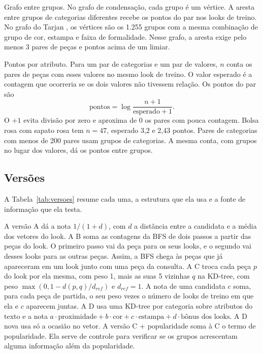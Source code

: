 \documentclass[conference]{IEEEtran}
\begin{document}
Grafo entre grupos. No grafo de condensação, cada grupo é um vértice. A aresta entre grupos de categorias diferentes recebe os pontos do par nos looks de treino. No grafo do Tarjan \cite{tarjan1972}, os vértices são os 1.255 grupos com a mesma combinação de grupo de cor, estampa e faixa de formalidade. Nesse grafo, a aresta exige pelo menos 3 pares de peças e pontos acima de um limiar.

Pontos por atributo. Para um par de categorias e um par de valores, $n$ conta os pares de peças com esses valores no mesmo look de treino. O valor esperado é a contagem que ocorreria se os dois valores não tivessem relação. Os pontos do par são
\begin{equation}
\text{pontos} = \log \frac{n + 1}{\text{esperado} + 1}.
\label{eq:pontos}
\end{equation}
O $+1$ evita divisão por zero e aproxima de 0 os pares com pouca contagem. Bolsa rosa com sapato rosa tem $n = 47$, esperado 3,2 e 2,43 pontos. Pares de categorias com menos de 200 pares usam grupos de categorias. A mesma conta, com grupos no lugar dos valores, dá os pontos entre grupos.

\subsection{Versões}

A Tabela~\ref{tab:versoes} resume cada uma, a estrutura que ela usa e a fonte de informação que ela testa.

A versão A dá a nota $1/(1 + d)$, com $d$ a distância entre a candidata e a média dos vetores do look. A B soma as contagens da BFS de dois passos a partir das peças do look. O primeiro passo vai da peça para os seus looks, e o segundo vai desses looks para as outras peças. Assim, a BFS chega às peças que já apareceram em um look junto com uma peça da consulta. A C troca cada peça $p$ do look por ela mesma, com peso 1, mais as suas 5 vizinhas $q$ na KD-tree, com peso $\max(0, 1 - d(p, q)/d_{ref})$ e $d_{ref} = 1$. A nota de uma candidata $c$ soma, para cada peça de partida, o seu peso vezes o número de looks de treino em que ela e $c$ aparecem juntas. A D usa uma KD-tree por categoria sobre atributos do texto e a nota $a \cdot \text{proximidade} + b \cdot \text{cor} + c \cdot \text{estampa} + d \cdot \text{bônus dos looks}$. A D nova usa só a ocasião no vetor. A versão C + popularidade soma à C o termo de popularidade. Ela serve de controle para verificar se os grupos acrescentam alguma informação além da popularidade.
\end{document}

